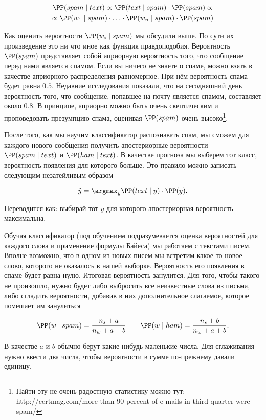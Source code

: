 \begin{multline*}
\PP(spam \mid text)  \propto  \PP(text \mid spam) \cdot \PP(spam) \propto \\ \propto \PP(w_1 \mid spam) \cdot \ldots \cdot \PP(w_n \mid spam) \cdot \PP(spam)
\end{multline*}

Как оценить вероятности $\PP(w_i \mid spam)$ мы обсудили выше. По сути их произведение это ни что иное как функция правдоподобия.  Вероятность $\PP(spam)$ представляет собой априорную вероятность того, что сообщение перед нами является спамом. Если вы ничего не знаете о спаме, можно взять в качестве априорного распределения равномерное. При нём вероятность спама будет равна $0.5$.  Недавние исследования показали, что на сегодняшний день вероятность того, что сообщение, попавшее на почту является спамом, составляет около $0.8$. В принципе, априорно можно быть очень скептическим и проповедовать презумпцию спама, оценивая $\PP(spam)$ очень высоко\footnote{Найти эту не очень радостную статистику можно тут: http://certmag.com/more-than-90-percent-of-e-mails-in-third-quarter-were-spam/}. 

После того, как мы научим классификатор распознавать спам, мы сможем для каждого нового сообщения получить апостериорные вероятности $\PP(spam \mid text)$  и $\PP(ham \mid text)$. В качестве прогноза мы выберем тот класс, вероятность появления для которого больше. Это правило можно записать следующим незатейливым образом

\[ \hat y = \argmax_{y} \PP(text \mid y) \cdot \PP(y). \] 

Переводится как: выбирай тот $y$ для которого апостериорная вероятность максимальна. 

Обучая классификатор (под обучением подразумевается оценка вероятностей для каждого слова и применение формулы Байеса) мы работаем с текстами писем. Вполне возможно, что в одном из новых писем мы встретим какое-то новое слово, которого не оказалось в нашей выборке. Вероятность его появления в спаме будет равна нулю. Итоговая вероятность занулится. Для того, чтобы такого не произошло, нужно будет либо выбросить все неизвестные слова из письма, либо сгладить вероятности, добавив в них дополнительное слагаемое, которое помешает им занулиться
	
	\[ \PP(w \mid spam) = \frac{n_s + a}{n_w + a + b} \qquad \PP(w \mid ham) = \frac{n_s + b}{n_w + a + b}.\]
	
В качестве $a$ и $b$ обычно берут какие-нибудь маленькие числа.  Для сглаживания нужно ввести два числа, чтобы вероятности в сумме по-прежнему давали единицу.  

